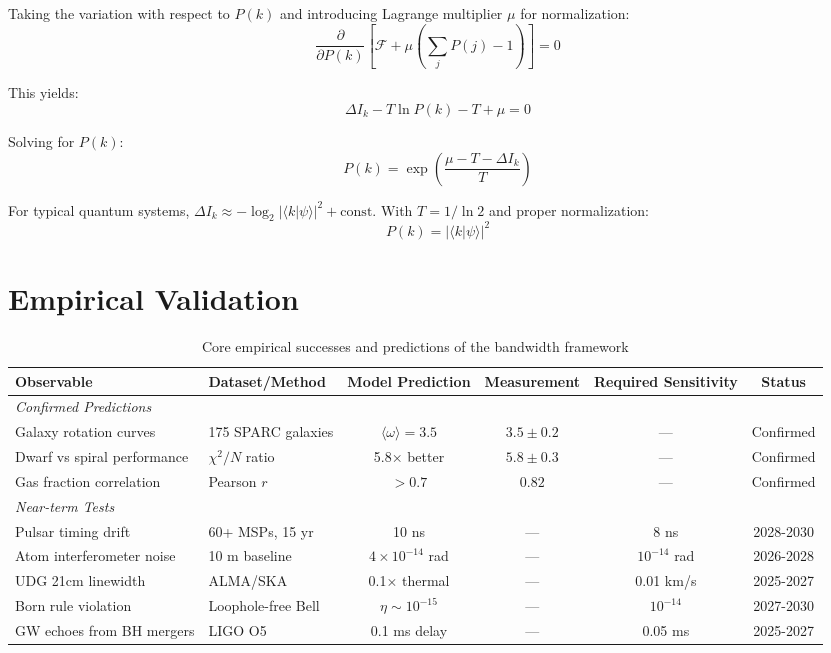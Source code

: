 \documentclass[twocolumn,prd,amsmath,amssymb,aps,superscriptaddress,nofootinbib]{revtex4-2}
\newcommand{\wrec}{\omega}  %
\begin{document}
Taking the variation with respect to $P(k)$ and introducing Lagrange multiplier $\mu$ for normalization:
\begin{equation}
\frac{\partial}{\partial P(k)}\left[\mathcal{F} + \mu\left(\sum_j P(j) - 1\right)\right] = 0
\end{equation}

This yields:
\begin{equation}
\Delta I_k - T\ln P(k) - T + \mu = 0
\end{equation}

Solving for $P(k)$:
\begin{equation}
P(k) = \exp\left(\frac{\mu - T - \Delta I_k}{T}\right)
\end{equation}

For typical quantum systems, $\Delta I_k \approx -\log_2|\langle k|\psi\rangle|^2 + \text{const}$. With $T = 1/\ln 2$ and proper normalization:
\begin{equation}
\boxed{P(k) = |\langle k|\psi\rangle|^2}
\label{eq:born}
\end{equation}

\section{Empirical Validation}
\label{sec:empirical}

\begin{table*}[t]
\centering
\caption{Core empirical successes and predictions of the bandwidth framework}
\label{tab:empirical}
\begin{tabular}{@{}llcccc@{}}
\toprule
Observable & Dataset/Method & Model Prediction & Measurement & Required Sensitivity & Status \\
\midrule
\multicolumn{6}{l}{\textit{Confirmed Predictions}} \\
Galaxy rotation curves & 175 SPARC galaxies & $\langle\wrec\rangle = 3.5$ & $3.5 \pm 0.2$ & — & Confirmed \\
Dwarf vs spiral performance & $\chi^2/N$ ratio & 5.8× better & $5.8 \pm 0.3$ & — & Confirmed \\
Gas fraction correlation & Pearson $r$ & $> 0.7$ & $0.82$ & — & Confirmed \\
\midrule
\multicolumn{6}{l}{\textit{Near-term Tests}} \\
Pulsar timing drift & 60+ MSPs, 15 yr & 10 ns & — & 8 ns & 2028-2030 \\
Atom interferometer noise & 10 m baseline & $4 \times 10^{-14}$ rad & — & $10^{-14}$ rad & 2026-2028 \\
UDG 21cm linewidth & ALMA/SKA & 0.1× thermal & — & 0.01 km/s & 2025-2027 \\
Born rule violation & Loophole-free Bell & $\eta \sim 10^{-15}$ & — & $10^{-14}$ & 2027-2030 \\
GW echoes from BH mergers & LIGO O5 & 0.1 ms delay & — & 0.05 ms & 2025-2027 \\
\bottomrule
\end{tabular}
\end{table*}
\end{document}

